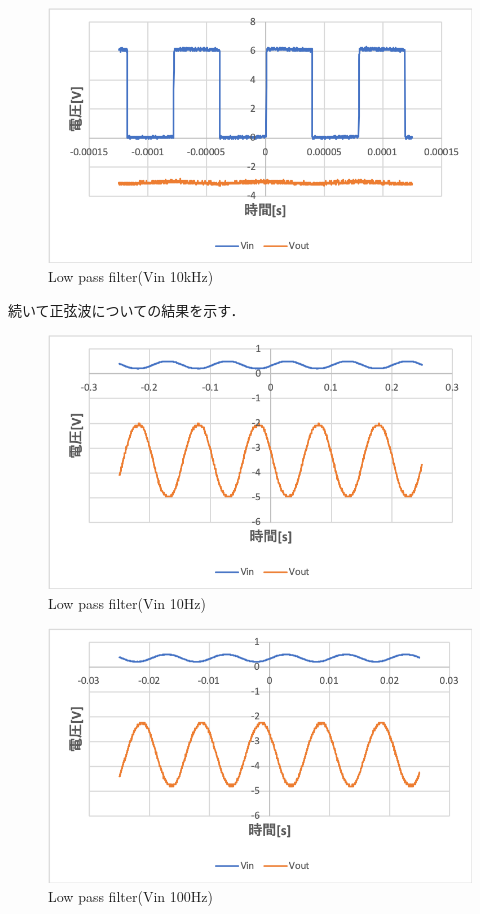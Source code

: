 \documentclass[11pt, a4paper,twocolumn]{jarticle}
\begin{document}
\begin{figure}[htbp]
 \begin{center}
  \includegraphics[width=0.8\linewidth]{fig34.png}
 \end{center}
 \caption{Low pass filter(Vin 10kHz)}
 \label{fig:34}
\end{figure}

\newpage

続いて正弦波についての結果を示す．

\begin{figure}[htbp]
 \begin{center}
  \includegraphics[width=0.8\linewidth]{fig35.png}
 \end{center}
 \caption{Low pass filter(Vin 10Hz)}
 \label{fig:35}
\end{figure}

\begin{figure}[htbp]
 \begin{center}
  \includegraphics[width=0.8\linewidth]{fig36.png}
 \end{center}
 \caption{Low pass filter(Vin 100Hz)}
 \label{fig:36}
\end{figure}
\end{document}
